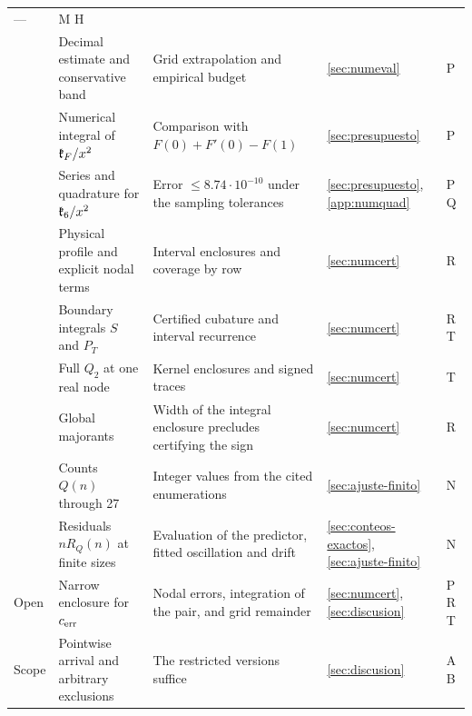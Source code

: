 {\begin{longtable}{@{}L{.09\linewidth}L{.25\linewidth}L{.33\linewidth}L{.13\linewidth}L{.08\linewidth}@{}}
 --- & M H \\
 & Decimal estimate and conservative band &
 Grid extrapolation and empirical budget &
 \ref{sec:numeval} & P \\
 & Numerical integral of $\mathfrak{k}_F/x^2$ &
 Comparison with $F(0)+F'(0)-F(1)$ &
 \ref{sec:presupuesto} & P \\
 & Series and quadrature for $\mathfrak{k}_6/x^2$ &
 Error $\le8.74\cdot10^{-10}$ under the sampling tolerances &
 \ref{sec:presupuesto}, \ref{app:numquad} & P Q \\
 & Physical profile and explicit nodal terms &
 Interval enclosures and coverage by row &
 \ref{sec:numcert} & R \\
 & Boundary integrals $S$ and $P_T$ &
 Certified cubature and interval recurrence &
 \ref{sec:numcert} & R T \\
 & Full $Q_2$ at one real node &
 Kernel enclosures and signed traces &
 \ref{sec:numcert} & T \\
 & Global majorants &
 Width of the integral enclosure precludes certifying the sign &
 \ref{sec:numcert} & R \\
 & Counts $Q(n)$ through 27 &
 Integer values from the cited enumerations &
 \ref{sec:ajuste-finito} & N \\
 & Residuals $nR_Q(n)$ at finite sizes &
 Evaluation of the predictor, fitted oscillation and drift &
 \ref{sec:conteos-exactos}, \ref{sec:ajuste-finito} & N \\
Open & Narrow enclosure for $c_{\mathrm{err}}$ &
 Nodal errors, integration of the pair, and grid remainder &
 \ref{sec:numcert}, \ref{sec:discusion} & P R T \\
Scope & Pointwise arrival and arbitrary exclusions &
 The restricted versions suffice &
 \ref{sec:discusion} & A B \\
\bottomrule
\end{longtable}
}
